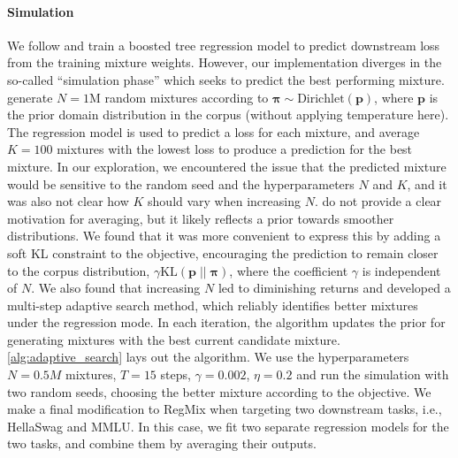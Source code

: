 \paragraph{Simulation} We follow \citet{liu2024regmix} and train a boosted tree regression model to predict downstream loss from the training mixture weights.
However, our implementation diverges in the so-called ``simulation phase'' which seeks to predict the best performing mixture. \citet{liu2024regmix} generate $N=1$M random mixtures according to $\boldsymbol{\pi} \sim \text{Dirichlet}(\boldsymbol{p})$, where $\boldsymbol{p}$ is the prior domain distribution in the corpus (without applying temperature here).
The regression model is used to predict a loss for each mixture, and \citet{liu2024regmix} average $K=100$ mixtures with the lowest loss to produce a prediction for the best mixture.
In our exploration, we encountered the issue that the predicted mixture would be sensitive to the random seed and the hyperparameters $N$ and $K$, and it was also not clear how $K$ should vary when increasing $N$.
\citet{liu2024regmix} do not provide a clear motivation for averaging, but it likely reflects a prior towards smoother distributions.
We found that it was more convenient to express this by adding a soft KL constraint to the objective, encouraging the prediction to remain closer to the corpus distribution, $\gamma\text{KL}(\boldsymbol{p}\;||\;\boldsymbol{\pi})$, where the coefficient $\gamma$ is independent of $N$.
We also found that increasing $N$ led to diminishing returns and developed a multi-step adaptive search method, which reliably identifies better mixtures under the regression mode.
In each iteration, the algorithm updates the prior for generating mixtures with the best current candidate mixture. \autoref{alg:adaptive_search} lays out the algorithm. We use the hyperparameters $N=0.5M$ mixtures, $T=15$ steps, $\gamma = 0.002$, $\eta =0.2$ and run the simulation with two random seeds, choosing the better mixture according to the objective.
We make a final modification to RegMix when targeting two downstream tasks, i.e., HellaSwag and MMLU. In this case, we fit two separate regression models for the two tasks, and combine them by averaging their outputs.


